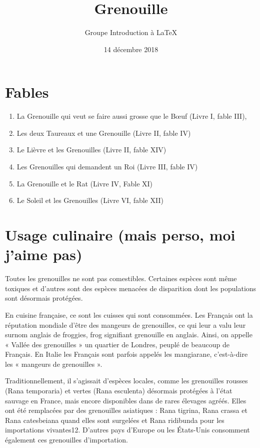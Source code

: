 \documentclass[10pt,a4paper]{article}
\title{Grenouille}
\date {14 décembre 2018}
\author{Groupe Introduction à \LaTeX}
\begin{document}


	\maketitle



	
	
	\section*{Fables}
		\begin{enumerate}
			\item La Grenouille qui veut se faire aussi grosse que le Bœuf (Livre I, fable III),
			\item Les deux Taureaux et une Grenouille (Livre II, fable IV)
			\item Le Lièvre et les Grenouilles (Livre II, fable XIV)
			\item Les Grenouilles qui demandent un Roi (Livre III, fable IV)
			\item La Grenouille et le Rat (Livre IV, Fable XI)
			\item Le Soleil et les Grenouilles (Livre VI, fable XII)
		\end{enumerate}
		\section{Usage culinaire (mais perso, moi j'aime pas)}

Toutes les grenouilles ne sont pas comestibles. Certaines espèces sont même toxiques et d'autres sont des espèces menacées de disparition dont les populations sont désormais protégées.

En cuisine française, ce sont les cuisses qui sont consommées. Les Français ont la réputation mondiale d'être des mangeurs de grenouilles, ce qui leur a valu leur surnom anglais de froggies, frog signifiant grenouille en anglais. Ainsi, on appelle « Vallée des grenouilles » un quartier de Londres, peuplé de beaucoup de Français.
En Italie les Français sont parfois appelés les mangiarane, c'est-à-dire les « mangeurs de grenouilles ».

Traditionnellement, il s'agissait d'espèces locales, comme les grenouilles rousses (Rana temporaria) et vertes (Rana esculenta) désormais protégées à l'état sauvage en France, mais encore disponibles dans de rares élevages agréés. Elles ont été remplacées par des grenouilles asiatiques : Rana tigrina, Rana crassa et Rana catesbeiana quand elles sont surgelées et Rana ridibunda pour les importations vivantes12. D'autres pays d'Europe ou les États-Unis consomment également ces grenouilles d'importation.
\end{document}

